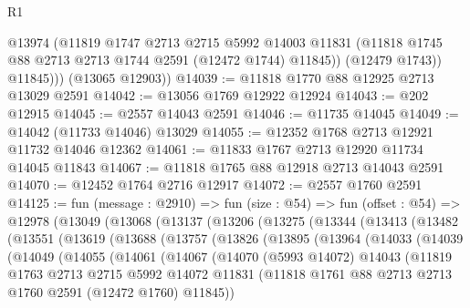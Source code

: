 \begin{lexlean}{R1}
\begin{coremodule}
              @13974
              (@11819
                @1747
                @2713
                @2715
                @5992
                @14003
                @11831
                (@11818 @1745 @88 @2713 @2713 @1744 @2591 (@12472 @1744) @11845))
              (@12479 @1743))
            @11845)))
      (@13065 @12903))
@14039 := @11818 @1770 @88 @12925 @2713 @13029 @2591
@14042 := @13056 @1769 @12922 @12924
@14043 := @202 @12915
@14045 := @2557 @14043 @2591
@14046 := @11735 @14045
@14049 := @14042 (@11733 @14046) @13029
@14055 := @12352 @1768 @2713 @12921 @11732 @14046 @12362
@14061 := @11833 @1767 @2713 @12920 @11734 @14045 @11843
@14067 := @11818 @1765 @88 @12918 @2713 @14043 @2591
@14070 := @12452 @1764 @2716 @12917
@14072 := @2557 @1760 @2591
@14125 := fun (message : @2910) =>
  fun (size : @54) =>
  fun (offset : @54) =>
  @12978
    (@13049
      (@13068
        (@13137
          (@13206
            (@13275
              (@13344
                (@13413
                  (@13482
                    (@13551
                      (@13619
                        (@13688
                          (@13757
                            (@13826
                              (@13895
                                (@13964
                                  (@14033
                                    (@14039
                                      (@14049
                                        (@14055
                                          (@14061
                                            (@14067
                                              (@14070
                                                (@5993 @14072)
                                                @14043
                                                (@11819
                                                  @1763
                                                  @2713
                                                  @2715
                                                  @5992
                                                  @14072
                                                  @11831
                                                  (@11818
                                                    @1761
                                                    @88
                                                    @2713
                                                    @2713
                                                    @1760
                                                    @2591
                                                    (@12472 @1760)
                                                    @11845))

\end{coremodule}
\end{lexlean}
